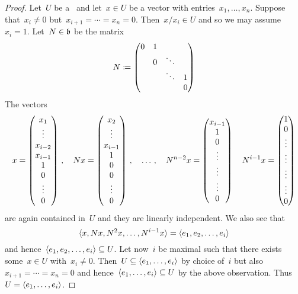 \begin{proof}
  Let~$U$ be a~{\subrepresentation{$\blie$}} and let~$x \in U$ be a vector with entries~$x_1, \dotsc, x_n$.
  Suppose that~$x_i \neq 0$ but~$x_{i+1} = \dotsb = x_n = 0$.
  Then~$x/x_i \in U$ and so we may assume~$x_i = 1$.
  Let~$N \in \mathfrak{b}$ be the matrix
  \[
    N
    \coloneqq
    \begin{pmatrix}
      0 & 1 &         &   \\
        & 0 & \ddots  &   \\
        &   & \ddots  & 1 \\
        &   &         & 0
    \end{pmatrix}
  \]
  The vectors
  \[
    x
    =
    \begin{pmatrix} x_1 \\ \vdots \\ x_{i-2} \\ x_{i-1} \\ 1 \\ 0 \\ \vdots \\ 0 \end{pmatrix} \,,
    \quad
    N x
    =
    \begin{pmatrix} x_2 \\ \vdots \\ x_{i-1} \\ 1 \\ 0 \\ 0 \\ \vdots \\ 0 \end{pmatrix} \,,
    \quad
    \dotsc \,,
    \quad
    N^{n-2} x
    =
    \begin{pmatrix} x_{i-1} \\ 1 \\ 0 \\ \vdots \\ \vdots \\ \vdots \\ 0 \end{pmatrix}
    \quad
    N^{i-1} x
    =
    \begin{pmatrix} 1 \\ 0 \\ \vdots \\ \vdots \\ \vdots \\ \vdots \\ 0 \end{pmatrix}
  \]
  are again contained in~$U$ and they are linearly independent.
  We also see that
  \[
    \langle x, Nx, N^2 x, \dotsc, N^{i-1} x\rangle
    =
    \langle e_1, e_2, \dotsc, e_i\rangle
  \]
  and hence~$\langle e_1, e_2, \dotsc, e_i\rangle \subseteq U$.
  Let now~$i$ be maximal such that there exists some~$x \in U$ with~$x_i \neq 0$.
  Then~$U \subseteq \langle e_1, \dotsc, e_i\rangle$ by choice of~$i$ but also~$x_{i+1} = \dotsb = x_n = 0$ and hence~$\langle e_1, \dotsc, e_i\rangle \subseteq U$ by the above observation.
  Thus~$U = \langle e_1, \dotsc, e_i\rangle$.
\end{proof}

